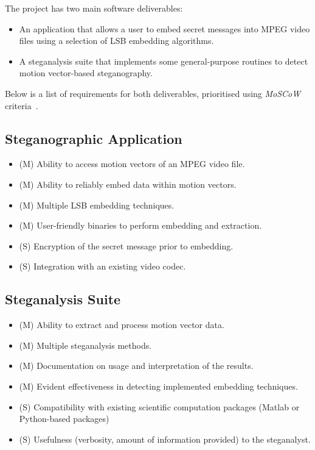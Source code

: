 \documentclass[12pt,british,twoside,notitlepage,usenames,dvipsnames,hypens,final]{report}
\numberwithin{equation}{section}
\numberwithin{figure}{section}
\begin{document}
The project has two main software deliverables:
\begin{itemize}
\item  An application that allows a user to embed secret messages into MPEG video files using a selection of LSB embedding algorithms.
\item A steganalysis suite that implements some general-purpose routines to detect motion vector-based steganography.
\end{itemize}

Below is a list of requirements for both deliverables, prioritised using \emph{MoSCoW} criteria~\cite{softid-notes}.

\subsection{Steganographic Application}
\begin{itemize}
\item (M) Ability to access motion vectors of an MPEG video file.
\item (M) Ability to reliably embed data within motion vectors.
\item (M) Multiple LSB embedding techniques.
\item (M) User-friendly binaries to perform embedding and extraction.
\item (S) Encryption of the secret message prior to embedding.
\item (S) Integration with an existing video codec.
\end{itemize}

\subsection{Steganalysis Suite}
\begin{itemize}
\item (M) Ability to extract and process motion vector data.
\item (M) Multiple steganalysis methods.
\item (M) Documentation on usage and interpretation of the results.
\item (M) Evident effectiveness in detecting implemented embedding techniques.
\item (S) Compatibility with existing scientific computation packages (Matlab or Python-based packages)
\item (S) Usefulness (verbosity, amount of information provided) to the steganalyst.
\end{itemize}
\end{document}

